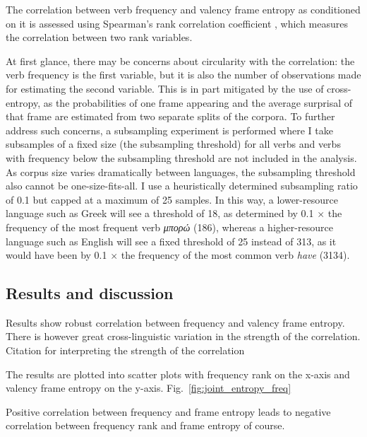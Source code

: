The correlation between verb frequency and valency frame entropy as conditioned on it is assessed using Spearman's rank correlation coefficient \citep{spearman1904}, which measures the correlation between two rank variables. 

At first glance, there may be concerns about circularity with the correlation: the verb frequency is the first variable, but it is also the number of observations made for estimating the second variable. This is in part mitigated by the use of cross-entropy, as the probabilities of one frame appearing and the average surprisal of that frame are estimated from two separate splits of the corpora. To further address such concerns, a subsampling experiment is performed where I take subsamples of a fixed size (the subsampling threshold) for all verbs and verbs with frequency below the subsampling threshold are not included in the analysis. As corpus size varies dramatically between languages, the subsampling threshold also cannot be one-size-fits-all. I use a heuristically determined subsampling ratio of 0.1 but capped at a maximum of 25 samples. In this way, a lower-resource language such as Greek will see a threshold of 18, as determined by 0.1 $\times$ the frequency of the most frequent verb \textit{μπορώ} (186), whereas a higher-resource language such as English will see a fixed threshold of 25 instead of 313, as it would have been by 0.1 $\times$ the frequency of the most common verb \textit{have} (3134).

\subsection{Results and discussion}

Results show robust correlation between frequency and valency frame entropy. There is however great cross-linguistic variation in the strength of the correlation. Citation for interpreting the strength of the correlation \citep{schober2018}


The results are plotted into scatter plots with frequency rank on the x-axis and valency frame entropy on the y-axis. Fig.~\ref{fig:joint_entropy_freq} 

Positive correlation between frequency and frame entropy leads to negative correlation between frequency rank and frame entropy of course.

